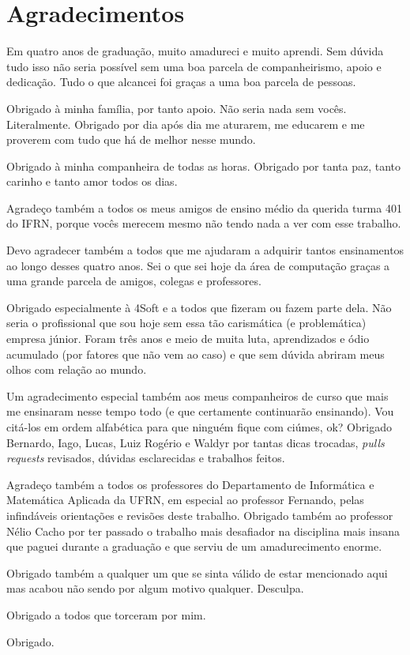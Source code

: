 
\chapter*{Agradecimentos}

Em quatro anos de graduação, muito amadureci e muito aprendi. Sem dúvida tudo isso não seria possível sem uma boa parcela de companheirismo, apoio e dedicação. Tudo o que alcancei foi graças a uma boa parcela de pessoas.

Obrigado à minha família, por tanto apoio. Não seria nada sem vocês. Literalmente. Obrigado por dia após dia me aturarem, me educarem e me proverem com tudo que há de melhor nesse mundo.

Obrigado à minha companheira de todas as horas. Obrigado por tanta paz, tanto carinho e tanto amor todos os dias.

Agradeço também a todos os meus amigos de ensino médio da querida turma 401 do IFRN, porque vocês merecem mesmo não tendo nada a ver com esse trabalho.

Devo agradecer também a todos que me ajudaram a adquirir tantos ensinamentos ao longo desses quatro anos. Sei o que sei hoje da área de computação graças a uma grande parcela de amigos, colegas e professores.

Obrigado especialmente à 4Soft e a todos que fizeram ou fazem parte dela. Não seria o profissional que sou hoje sem essa tão carismática (e problemática) empresa júnior. Foram três anos e meio de muita luta, aprendizados e ódio acumulado (por fatores que não vem ao caso) e que sem dúvida abriram meus olhos com relação ao mundo.

Um agradecimento especial também aos meus companheiros de curso que mais me ensinaram nesse tempo todo (e que certamente continuarão ensinando). Vou citá-los em ordem alfabética para que ninguém fique com ciúmes, ok? Obrigado Bernardo, Iago, Lucas, Luiz Rogério e Waldyr por tantas dicas trocadas, \textit{pulls requests} revisados, dúvidas esclarecidas e trabalhos feitos.

Agradeço também a todos os professores do Departamento de Informática e Matemática Aplicada da UFRN, em especial ao professor Fernando, pelas infindáveis orientações e revisões deste trabalho. Obrigado também ao professor Nélio Cacho por ter passado o trabalho mais desafiador na disciplina mais insana que paguei durante a graduação e que serviu de um amadurecimento enorme.

Obrigado também a qualquer um que se sinta válido de estar mencionado aqui mas acabou não sendo por algum motivo qualquer. Desculpa.

Obrigado a todos que torceram por mim.

Obrigado.
